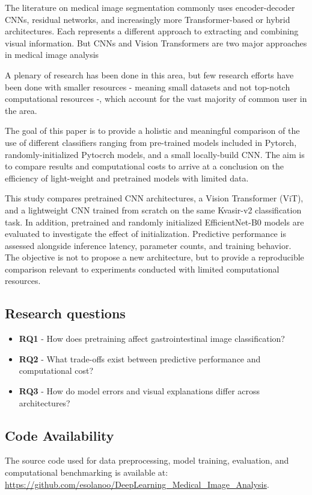 \documentclass[conference]{IEEEtran}
\begin{document}
The literature on medical image segmentation commonly uses encoder-decoder CNNs, residual networks, and increasingly more Transformer-based or hybrid architectures. Each represents a different approach to extracting and combining visual information. But CNNs and Vision Transformers are two major approaches in medical image analysis 

A plenary of research has been done in this area, but few research efforts have been done with smaller resources - meaning small datasets and not top-notch computational resources -, which account for the vast majority of common user in the area.

The goal of this paper is to provide a holistic and meaningful comparison of the use of different classifiers ranging from pre-trained models included in Pytorch, randomly-initialized Pytocrch models, and a small locally-build CNN. The aim is to compare results and computational costs to arrive at a conclusion on the efficiency of light-weight and pretrained models with limited data.

This study compares pretrained CNN architectures, a Vision Transformer (ViT), and a lightweight CNN trained from scratch on the same Kvasir-v2 classification task. In addition, pretrained and randomly initialized EfficientNet-B0 models are evaluated to investigate the effect of initialization. Predictive performance is assessed alongside inference latency, parameter counts, and training behavior. The objective is not to propose a new architecture, but to provide a reproducible comparison relevant to experiments conducted with limited computational resources.

\subsection{Research questions}

\begin{itemize}
\item \textbf{RQ1} - How does pretraining affect gastrointestinal image classification?
\item \textbf{RQ2} - What trade-offs exist between predictive performance and computational cost?
\item \textbf{RQ3} - How do model errors and visual explanations differ across architectures?
\end{itemize}

\subsection{Code Availability}
The source code used for data preprocessing, model training, evaluation,
and computational benchmarking is available at:
\url{https://github.com/esolanoo/DeepLearning_Medical_Image_Analysis}.
\end{document}

